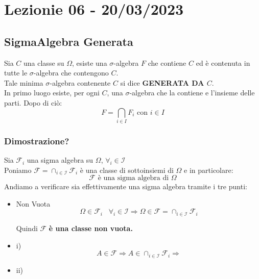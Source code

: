 \section{Lezionie 06 - 20/03/2023}

\subsection{SigmaAlgebra Generata}
Sia $C$ una classe su $\Omega$, esiste una $\sigma$-algebra $F$ che contiene $C$ ed è contenuta in tutte le $\sigma$-algebra che contengono $C$.\\
Tale minima $\sigma$-algebra contenente $C$ si dice \textbf{GENERATA DA $C$}.\\
In primo luogo esiste, per ogni $C$, una $\sigma$-algebra che la contiene e l'insieme delle parti.
Dopo di ciò:
$$ F = \bigcap_{i \in I} F_i  \text{ con } i \in I $$

\subsubsection{Dimostrazione?}
Sia $ \mathcal{F}_i $ una sigma algebra su $\Omega$, $\forall_i \in \mathcal{I}$\\
Poniamo $\mathcal{F} = \cap_{i \in \mathcal{I}} \mathcal{F}_i$ è una classe di sottoinsiemi di $\Omega$ e in particolare:
$$ \mathcal{F} \text{ è una sigma algebra di } \Omega $$
Andiamo a verificare sia effettivamente una sigma algebra tramite i tre punti:
\begin{itemize}
\item Non Vuota\\
$$ \Omega \in \mathcal{F}_i \;\;\; \forall_i \in \mathcal{I} \Rightarrow \Omega \in \mathcal{F} = \cap_{i \in \mathcal{I}} \mathcal{F}_i $$
\begin{center}
Quindi $\mathcal{F}$ \textbf{è una classe non vuota.}
\end{center}

\item i)\\
$$ A \in \mathcal{F} \Rightarrow A \in \cap_{i \in \mathcal{I}} \mathcal{F}_i \Rightarrow  $$

\item ii)\\

\end{itemize}


